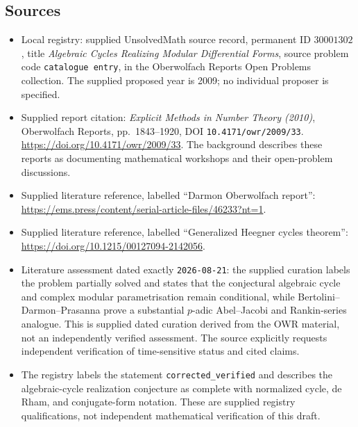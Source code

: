 \documentclass[11pt]{article}
\begin{document}
\subsection{Sources}
\begin{itemize}
\item Local registry: supplied UnsolvedMath source record, permanent ID \(30001302\), title \emph{Algebraic Cycles Realizing Modular Differential Forms}, source problem code \texttt{catalogue entry}, in the Oberwolfach Reports Open Problems collection. The supplied proposed year is 2009; no individual proposer is specified.
\item Supplied report citation: \emph{Explicit Methods in Number Theory (2010)}, Oberwolfach Reports, pp.\ 1843--1920, DOI \texttt{10.4171/owr/2009/33}. \url{https://doi.org/10.4171/owr/2009/33}. The background describes these reports as documenting mathematical workshops and their open-problem discussions.
\item Supplied literature reference, labelled ``Darmon Oberwolfach report'': \url{https://ems.press/content/serial-article-files/46233?nt=1}.
\item Supplied literature reference, labelled ``Generalized Heegner cycles theorem'': \url{https://doi.org/10.1215/00127094-2142056}.
\item Literature assessment dated exactly \texttt{2026-08-21}: the supplied curation labels the problem partially solved and states that the conjectural algebraic cycle and complex modular parametrisation remain conditional, while Bertolini--Darmon--Prasanna prove a substantial \(p\)-adic Abel--Jacobi and Rankin-series analogue. This is supplied dated curation derived from the OWR material, not an independently verified assessment. The source explicitly requests independent verification of time-sensitive status and cited claims.
\item The registry labels the statement \texttt{corrected\_verified} and describes the algebraic-cycle realization conjecture as complete with normalized cycle, de Rham, and conjugate-form notation. These are supplied registry qualifications, not independent mathematical verification of this draft.
\end{itemize}
\end{document}
